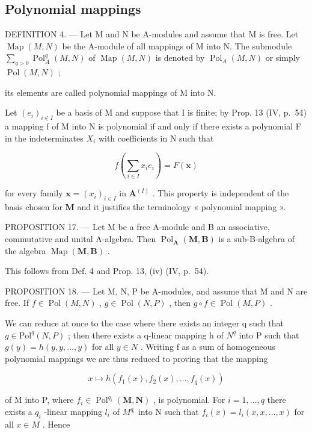 \subsection{Polynomial mappings}

DEFINITION 4. --- Let M and N be A-modules and assume that M is free. Let \(\operatorname{Map}(M, N)\) be the A-module of all mappings of M into N. The submodule \(\sum_{q > 0} \operatorname{Pol}_{A}^{q}(M, N)\) of \(\operatorname{Map}(M, N)\) is denoted by \(\operatorname{Pol}_{A}(M, N)\) or simply \(\operatorname{Pol}(M, N)\) ;

its elements are called polynomial mappings of M into N.

Let \((e_{i})_{i\in I}\) be a basis of M and suppose that I is finite; by Prop. 13 (IV, p.~54) a mapping f of M into N is polynomial if and only if there exists a polynomial F in the indeterminates \(X_{i}\) with coefficients in N such that

\[
f \left(\sum_ {i \in I} x _ {i} e _ {i}\right) = F (\mathbf {x})
\]

for every family \(\mathbf{x} = (x_i)_{i\in I}\) in \(\mathbf{A}^{(I)}\) . This property is independent of the basis chosen for \(\mathbf{M}\) and it justifies the terminology « polynomial mapping ».

PROPOSITION 17. --- Let M be a free A-module and B an associative, commutative and unital A-algebra. Then \(\operatorname{Pol}_{\mathbf{A}}(\mathbf{M}, \mathbf{B})\) is a sub-B-algebra of the algebra \(\operatorname{Map}(\mathbf{M}, \mathbf{B})\) .

This follows from Def. 4 and Prop. 13, (iv) (IV, p.~54).

PROPOSITION 18. --- Let M, N, P be A-modules, and assume that M and N are free. If \(f \in \operatorname{Pol}(M, N)\) , \(g \in \operatorname{Pol}(N, P)\) , then \(g \circ f \in \operatorname{Pol}(M, P)\) .

We can reduce at once to the case where there exists an integer q such that \(g \in \text{Pol}^{q}(N, P)\) ; then there exists a q-linear mapping h of \(N^{q}\) into P such that \(g(y) = h(y, y, \ldots, y)\) for all \(y \in N\) . Writing f as a sum of homogeneous polynomial mappings we are thus reduced to proving that the mapping

\[
x \mapsto h (f _ {1} (x), f _ {2} (x), \dots , f _ {q} (x))
\]

of M into P, where \(f_{i} \in \operatorname{Pol}^{q_{i}}(\mathbf{M}, \mathbf{N})\) , is polynomial. For \(i = 1, \ldots, q\) there exists a \(q_{i}\) -linear mapping \(l_{i}\) of \(M^{q_{i}}\) into N such that \(f_{i}(x) = l_{i}(x, x, \ldots, x)\) for all \(x \in M\) . Hence

